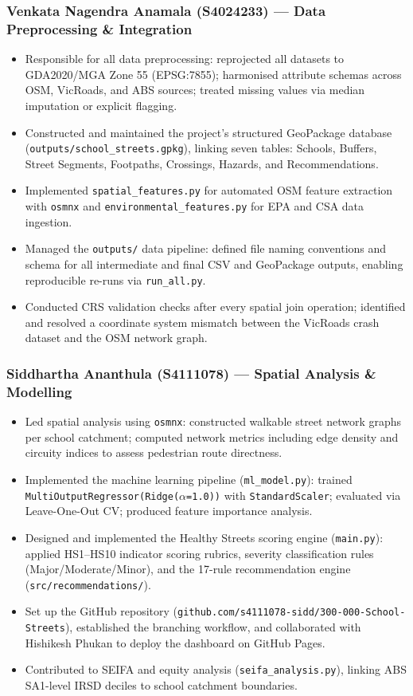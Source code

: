 \documentclass[11pt,a4paper]{article}
\begin{document}
\subsubsection*{Venkata Nagendra Anamala (S4024233) — Data Preprocessing \& Integration}
\begin{itemize}
  \item Responsible for all data preprocessing: reprojected all datasets to GDA2020/MGA Zone 55 (EPSG:7855); harmonised attribute schemas across OSM, VicRoads, and ABS sources; treated missing values via median imputation or explicit flagging.
  \item Constructed and maintained the project's structured GeoPackage database (\texttt{outputs/school\_streets.gpkg}), linking seven tables: Schools, Buffers, Street Segments, Footpaths, Crossings, Hazards, and Recommendations.
  \item Implemented \texttt{spatial\_features.py} for automated OSM feature extraction with \texttt{osmnx} and \texttt{environmental\_features.py} for EPA and CSA data ingestion.
  \item Managed the \texttt{outputs/} data pipeline: defined file naming conventions and schema for all intermediate and final CSV and GeoPackage outputs, enabling reproducible re-runs via \texttt{run\_all.py}.
  \item Conducted CRS validation checks after every spatial join operation; identified and resolved a coordinate system mismatch between the VicRoads crash dataset and the OSM network graph.
\end{itemize}

\subsubsection*{Siddhartha Ananthula (S4111078) — Spatial Analysis \& Modelling}
\begin{itemize}
  \item Led spatial analysis using \texttt{osmnx}: constructed walkable street network graphs per school catchment; computed network metrics including edge density and circuity indices to assess pedestrian route directness.
  \item Implemented the machine learning pipeline (\texttt{ml\_model.py}): trained \texttt{MultiOutputRegressor(Ridge($\alpha$=1.0))} with \texttt{StandardScaler}; evaluated via Leave-One-Out CV; produced feature importance analysis.
  \item Designed and implemented the Healthy Streets scoring engine (\texttt{main.py}): applied HS1--HS10 indicator scoring rubrics, severity classification rules (Major/Moderate/Minor), and the 17-rule recommendation engine (\texttt{src/recommendations/}).
  \item Set up the GitHub repository (\texttt{github.com/s4111078-sidd/300-000-School-Streets}), established the branching workflow, and collaborated with Hishikesh Phukan to deploy the dashboard on GitHub Pages.
  \item Contributed to SEIFA and equity analysis (\texttt{seifa\_analysis.py}), linking ABS SA1-level IRSD deciles to school catchment boundaries.
\end{itemize}
\end{document}
